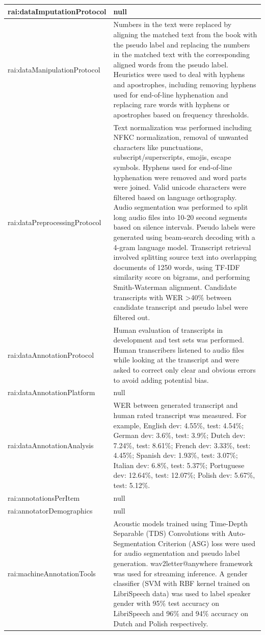 \documentclass[10pt,a4paper]{article}
\begin{document}
\begin{longtable}{|p{4cm}|p{12cm}|}
\hline
rai:dataImputationProtocol & null \\
\hline
rai:dataManipulationProtocol & Numbers in the text were replaced by aligning the matched text from the book with the pseudo label and replacing the numbers in the matched text with the corresponding aligned words from the pseudo label. Heuristics were used to deal with hyphens and apostrophes, including removing hyphens used for end-of-line hyphenation and replacing rare words with hyphens or apostrophes based on frequency thresholds. \\
\hline
rai:dataPreprocessingProtocol & Text normalization was performed including NFKC normalization, removal of unwanted characters like punctuations, subscript/superscripts, emojis, escape symbols. Hyphens used for end-of-line hyphenation were removed and word parts were joined. Valid unicode characters were filtered based on language orthography. Audio segmentation was performed to split long audio files into 10-20 second segments based on silence intervals. Pseudo labels were generated using beam-search decoding with a 4-gram language model. Transcript retrieval involved splitting source text into overlapping documents of 1250 words, using TF-IDF similarity score on bigrams, and performing Smith-Waterman alignment. Candidate transcripts with WER >40\% between candidate transcript and pseudo label were filtered out. \\
\hline
rai:dataAnnotationProtocol & Human evaluation of transcripts in development and test sets was performed. Human transcribers listened to audio files while looking at the transcript and were asked to correct only clear and obvious errors to avoid adding potential bias. \\
\hline
rai:dataAnnotationPlatform & null \\
\hline
rai:dataAnnotationAnalysis & WER between generated transcript and human rated transcript was measured. For example, English dev: 4.55\%, test: 4.54\%; German dev: 3.6\%, test: 3.9\%; Dutch dev: 7.24\%, test: 8.61\%; French dev: 3.33\%, test: 4.45\%; Spanish dev: 1.93\%, test: 3.07\%; Italian dev: 6.8\%, test: 5.37\%; Portuguese dev: 12.64\%, test: 12.07\%; Polish dev: 5.67\%, test: 5.12\%. \\
\hline
rai:annotationsPerItem & null \\
\hline
rai:annotatorDemographics & null \\
\hline
rai:machineAnnotationTools & Acoustic models trained using Time-Depth Separable (TDS) Convolutions with Auto-Segmentation Criterion (ASG) loss were used for audio segmentation and pseudo label generation. wav2letter@anywhere framework was used for streaming inference. A gender classifier (SVM with RBF kernel trained on LibriSpeech data) was used to label speaker gender with 95\% test accuracy on LibriSpeech and 96\% and 94\% accuracy on Dutch and Polish respectively. \\

\end{longtable}
\end{document}
